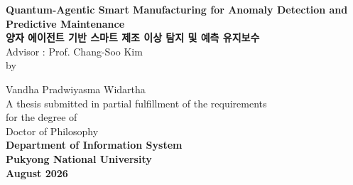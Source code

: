 \begin{titlepage}
    \centering
    {\Large \textbf{Quantum-Agentic Smart Manufacturing for Anomaly Detection and Predictive Maintenance}}\\[0.5cm]
    {\Large \textbf{양자 에이전트 기반 스마트 제조 이상 탐지 및 예측 유지보수}}\\[2cm]

    Advisor : Prof. Chang-Soo Kim \\[1cm]

    by
    
    Vandha Pradwiyasma Widartha\\[1cm]
    

    A thesis submitted in partial fulfillment of the requirements \\ 
    for the degree of \\ [0.5cm]
    Doctor of Philosophy \\[1.cm]
    \textbf{Department of Information System }\\
    \textbf{Pukyong National University}\\ [1cm]
    \textbf{August 2026}
\end{titlepage}